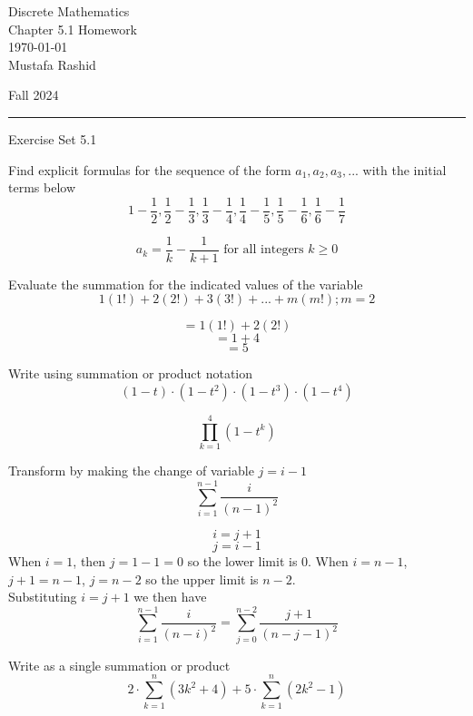 \documentclass[12pt,letterpaper, onecolumn]{exam}
\begin{document}
	
	\begingroup  
	\noindent\LARGE Discrete Mathematics\\
	\noindent\LARGE Chapter 5.1 Homework\\
	\noindent\large \today\\
	\noindent\large Mustafa Rashid\par
	\noindent\large Fall 2024\par
	\endgroup
	\rule{\textwidth}{0.4pt}
	\pointsdroppedatright
	\printanswers
	\renewcommand{\solutiontitle}{\noindent\textbf{Ans:}\enspace}  
	
	\centering\large Exercise Set 5.1\\
	\begin{questions}
		\setcounter{question}{8} \question  Find explicit formulas for the sequence of the form $a_1,a_2,a_3,...$ with the initial terms below
		$$1-\frac{1}{2},\frac{1}{2}-\frac{1}{3},\frac{1}{3}-\frac{1}{4},\frac{1}{4}-\frac{1}{5},\frac{1}{5}-\frac{1}{6},\frac{1}{6}-\frac{1}{7}$$
		
		\begin{solution}
			$$a_k=\frac{1}{k}-\frac{1}{k+1} \textrm{  for all integers } k\geq0$$
		\end{solution}
		\setcounter{question}{28} \question Evaluate the summation for the indicated values of the variable
		$$1(1!)+2(2!)+3(3!)+...+m(m!);m=2$$
		
		\begin{solution}
		$$=1(1!)+2(2!)$$
		$$=1+4$$
		$$=5$$
		\end{solution}
		\setcounter{question}{42} \question Write using summation or product notation
		$$(1-t)\cdot(1-t^2)\cdot(1-t^3)\cdot(1-t^4)$$
		
		\begin{solution}
		$$\prod_{k=1}^{4} (1-t^k)$$
		\end{solution}
		
		
		\setcounter{question}{51} \question Transform by making the change of variable $j=i-1$
		$$\sum^{n-1}_{i=1}\frac{i}{(n-1)^2}$$
		
		\begin{solution}
		$$i=j+1$$
		$$j=i-1$$
		When $i=1$, then $j=1-1=0$ so the lower limit is 0. When $i=n-1$, $j+1=n-1$, $j=n-2$ so the upper limit is $n-2$.\\
		Substituting $i=j+1$ we then have
		$$\sum^{n-1}_{i=1}\frac{i}{(n-i)^2}=\sum^{n-2}_{j=0}\frac{j+1}{(n-j-1)^2}$$
		\end{solution}
		
		\setcounter{question}{54} \question Write as a single summation or product
		$$2\cdot\sum^{n}_{k=1}(3k^2+4)+5\cdot\sum^{n}_{k=1}(2k^2-1)$$
		

\end{questions}
\end{document}
